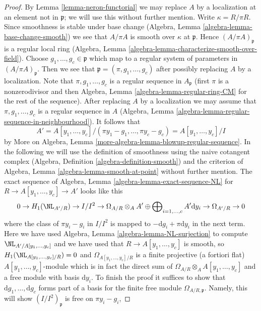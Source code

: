 \begin{proof}
By Lemma \ref{lemma-neron-functorial} we may replace $A$ by a localization
at an element not in $\mathfrak p$; we will use this without further mention.
Write $\kappa = R/\pi R$. Since smoothness is stable under base change
(Algebra, Lemma \ref{algebra-lemma-base-change-smooth})
we see that $A/\pi A$ is smooth over $\kappa$ at $\mathfrak p$.
Hence $(A/\pi A)_\mathfrak p$ is a regular local ring
(Algebra, Lemma \ref{algebra-lemma-characterize-smooth-over-field}).
Choose $g_1, \ldots, g_c \in \mathfrak p$ which map to
a regular system of parameters in $(A/\pi A)_\mathfrak p$.
Then we see that $\mathfrak p = (\pi, g_1, \ldots, g_c)$
after possibly replacing $A$ by a localization.
Note that $\pi, g_1, \ldots, g_c$ is a regular sequence
in $A_\mathfrak p$ (first $\pi$ is a nonzerodivisor and
then Algebra, Lemma \ref{algebra-lemma-regular-ring-CM}
for the rest of the sequence).
After replacing $A$ by a localization we may assume that
$\pi, g_1, \ldots, g_c$ is a regular sequence in $A$
(Algebra, Lemma \ref{algebra-lemma-regular-sequence-in-neighbourhood}).
It follows that
$$
A' = A[y_1, \ldots, y_c]/(\pi y_1 - g_1, \ldots, \pi y_c - g_c) =
A[y_1, \ldots, y_c]/I
$$
by More on Algebra, Lemma \ref{more-algebra-lemma-blowup-regular-sequence}.
In the following we will use the definition of smoothness using the
naive cotangent complex (Algebra, Definition \ref{algebra-definition-smooth})
and the criterion of Algebra, Lemma \ref{algebra-lemma-smooth-at-point}
without further mention.
The exact sequence of Algebra, Lemma \ref{algebra-lemma-exact-sequence-NL}
for $R \to A[y_1, \ldots, y_c] \to A'$ looks like this
$$
0 \to H_1(\NL_{A'/R}) \to I/I^2 \to
\Omega_{A/R} \otimes_A A' \oplus
\bigoplus\nolimits_{i = 1, \ldots, c} A' \text{d}y_i \to
\Omega_{A'/R} \to 0
$$
where the class of $\pi y_i - g_i$ in $I/I^2$ is mapped
to $- \text{d}g_i + \pi \text{d}y_i$ in the next term.
Here we have used Algebra, Lemma \ref{algebra-lemma-NL-surjection}
to compute $\NL_{A'/A[y_1, \ldots, y_c]}$ and we have used that
$R \to A[y_1, \ldots, y_c]$ is smooth, so
$H_1(\NL_{A[y_1, \ldots, y_c]/R}) = 0$ and
$\Omega_{A[y_1, \ldots, y_c]/R}$ is a finite projective (a fortiori flat)
$A[y_1, \ldots, y_c]$-module which is in fact the direct sum
of $\Omega_{A/R} \otimes_A A[y_1, \ldots, y_c]$ and a free
module with basis $\text{d}y_i$. To finish the proof it
suffices to show that $\text{d}g_1, \ldots, \text{d}g_c$
forms part of a basis for the finite free module $\Omega_{A/R, \mathfrak p}$.
Namely, this will show $(I/I^2)_\mathfrak p$ is free on $\pi y_i - g_i$,

\end{proof}
